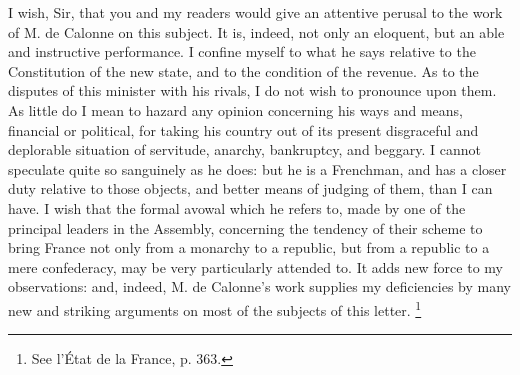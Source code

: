 I wish, Sir, that you and my readers would give an attentive perusal to the work of M. de Calonne on this subject. It is, indeed, not only an eloquent, but an able and instructive performance. I confine myself to what he says relative to the Constitution of the new state, and to the condition of the revenue. As to the disputes of this minister with his rivals, I do not wish to pronounce upon them. As little do I mean to hazard any opinion concerning his ways and means, financial or political, for taking his country out of its present disgraceful and deplorable situation of servitude, anarchy, bankruptcy, and beggary. I cannot speculate quite so sanguinely as he does: but he is a Frenchman, and has a closer duty relative to those objects, and better means of judging of them, than I can have. I wish that the formal avowal which he refers to, made by one of the principal leaders in the Assembly, concerning the tendency of their scheme to bring France not only from a monarchy to a republic, but from a republic to a mere confederacy, may be very particularly attended to. It adds new force to my observations: and, indeed, M. de Calonne's work supplies my deficiencies by many new and striking arguments on most of the subjects of this letter.
\footnote{ See l'État de la France, p. 363.}


